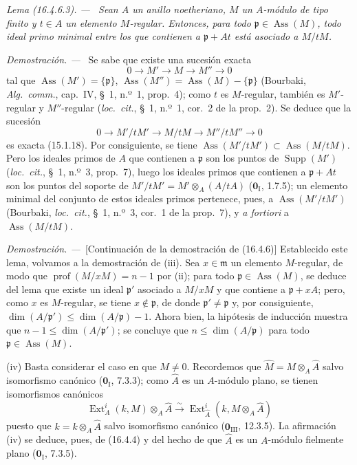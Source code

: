 \documentclass[10pt,oneside]{book}
\makeatletter
\newcommand{\setmanualcurrentlabel}[1]{\def\@currentlabel{#1}}
\newenvironment{lemma}[1][]{%
  \setmanualcurrentlabel{#1}\par\medskip\noindent\itshape Lema (#1). ---\ }{\par}
\newenvironment{proof}{%
  \par\medskip\noindent\textit{Demostración. ---\ }}{\par}
\providecommand{\setmin}{-}%
\makeatother
\begin{document}
\begin{lemma}[16.4.6.3]
\label{0.16.4.6.3-es}
Sean $A$ un anillo noetheriano, $M$ un $A$-módulo de tipo finito y $t\in A$ un
elemento $M$-regular. Entonces, para todo
$\mathfrak{p}\in\operatorname{Ass}(M)$, todo ideal primo minimal entre los que
contienen a $\mathfrak{p}+At$ está asociado a $M/tM$.
\end{lemma}

\begin{proof}
Se sabe que existe una sucesión exacta
\[
  0\to M'\to M\to M''\to0
\]
tal que $\operatorname{Ass}(M')=\{\mathfrak{p}\}$,
$\operatorname{Ass}(M'')=\operatorname{Ass}(M)\setmin\{\mathfrak{p}\}$ (Bourbaki,
\emph{Alg.~comm.}, cap.~IV, \S~1, n.º~1, prop.~4); como $t$ es
$M$-regular, también es $M'$-regular y $M''$-regular
(\emph{loc.~cit.}, \S~1, n.º~1, cor.~2 de la prop.~2). Se deduce que la
sucesión
\[
  0\to M'/tM'\to M/tM\to M''/tM''\to0
\]
es exacta (15.1.18). Por consiguiente, se tiene
$\operatorname{Ass}(M'/tM')\subset\operatorname{Ass}(M/tM)$. Pero los ideales
primos de $A$ que contienen a $\mathfrak{p}$ son los puntos de
$\operatorname{Supp}(M')$ (\emph{loc.~cit.}, \S~1, n.º~3, prop.~7), luego los
ideales primos que contienen a $\mathfrak{p}+At$ son los puntos del soporte de
$M'/tM'=M'\otimes_A(A/tA)$ ($\mathbf{0}_{\mathrm I}$, 1.7.5); un elemento minimal del
conjunto de estos ideales primos pertenece, pues, a
$\operatorname{Ass}(M'/tM')$ (Bourbaki, \emph{loc.~cit.}, \S~1, n.º~3,
cor.~1 de la prop.~7), y \emph{a fortiori} a
$\operatorname{Ass}(M/tM)$.
\end{proof}

\begin{proof}[Continuación de la demostración de (16.4.6)]
Establecido este lema, volvamos a la demostración de (iii). Sea
$x\in\mathfrak{m}$ un elemento $M$-regular, de modo que
$\operatorname{prof}(M/xM)=n-1$ por (ii); para todo
$\mathfrak{p}\in\operatorname{Ass}(M)$, se deduce del lema que existe un ideal
$\mathfrak{p}'$ asociado a $M/xM$ y que contiene a $\mathfrak{p}+xA$; pero,
como $x$ es $M$-regular, se tiene $x\notin\mathfrak{p}$, de donde
$\mathfrak{p}'\neq\mathfrak{p}$ y, por consiguiente,
$\dim(A/\mathfrak{p}')\leq\dim(A/\mathfrak{p})-1$. Ahora bien, la hipótesis de
inducción muestra que $n-1\leq\dim(A/\mathfrak{p}')$; se concluye que
$n\leq\dim(A/\mathfrak{p})$ para todo
$\mathfrak{p}\in\operatorname{Ass}(M)$.

(iv) Basta considerar el caso en que $M\neq0$. Recordemos que
$\widehat{M}=M\otimes_A\widehat{A}$ salvo isomorfismo canónico
($\mathbf{0}_{\mathrm I}$, 7.3.3); como $\widehat{A}$ es un $A$-módulo plano, se tienen
isomorfismos canónicos
\[
  \operatorname{Ext}^i_A(k,M)\otimes_A\widehat{A}
  \xrightarrow{\sim}
  \operatorname{Ext}^i_{\widehat{A}}
  (k,M\otimes_A\widehat{A})
\]
puesto que $k=k\otimes_A\widehat{A}$ salvo isomorfismo canónico
($\mathbf{0}_{\mathrm{III}}$, 12.3.5). La afirmación (iv) se deduce, pues, de (16.4.4) y
del hecho de que $\widehat{A}$ es un $A$-módulo fielmente plano
($\mathbf{0}_{\mathrm I}$, 7.3.5).
\end{proof}
\end{document}
